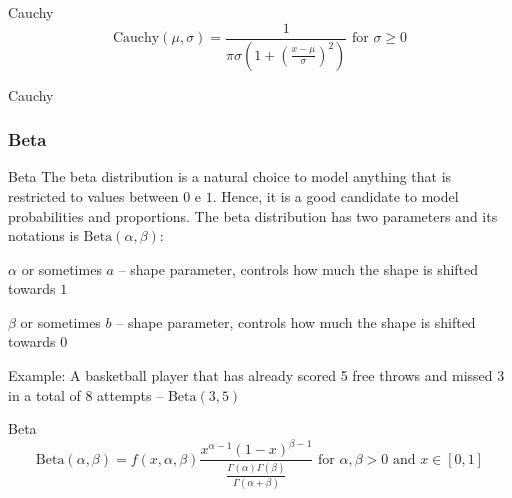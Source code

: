 \begin{frame}{Cauchy}
	$$\text{Cauchy}(\mu, \sigma) = \frac{1}{\pi \sigma \left(1 + \left(\frac{x - \mu}{\sigma} \right)^2 \right)} \text{ for $\sigma \geq 0$}$$
\end{frame}

\begin{frame}{Cauchy}
	\centering
\end{frame}

\subsubsection{Beta}
\begin{frame}{Beta}
	The beta distribution is a natural choice to model anything that is
	restricted to values between $0$ e $1$.
	Hence, it is a good candidate to model probabilities and proportions.
	\vfill
	The beta distribution has two parameters and its notations is
	$\text{Beta} (\alpha, \beta)$:
	\begin{vfilleditems}
		\item $\alpha$ or sometimes $a$ -- shape parameter,
		controls how much the shape is shifted towards $1$
		\item $\beta$ or sometimes $b$ -- shape parameter,
		controls how much the shape is shifted towards $0$
	\end{vfilleditems}
	\vfill
	Example: A basketball player that has already scored 5 free throws and
	missed 3 in a total of 8 attempts -- $\text{Beta}(3, 5)$
\end{frame}

\begin{frame}{Beta}
	$$\text{Beta} (\alpha, \beta) = f(x, \alpha, \beta) \frac{x^{\alpha-1}(1-x)^{\beta-1}} {\frac{\Gamma (\alpha )\Gamma (\beta )}{\Gamma (\alpha +\beta )}} \text{ for $\alpha,\beta > 0$ and $x \in [0, 1]$}$$
\end{frame}

